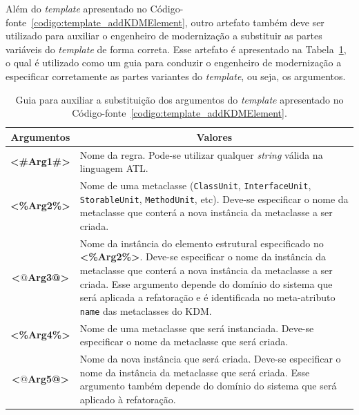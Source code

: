 Além do \textit{template} apresentado no Código-fonte~\ref{codigo:template_addKDMElement}, outro artefato também deve ser utilizado para auxiliar o engenheiro de modernização a substituir as partes variáveis do \textit{template} de forma correta. Esse artefato é apresentado na Tabela~\ref{tab:guia_template_operacao_add}, o qual é utilizado como um guia para conduzir o engenheiro de modernização a especificar corretamente as partes variantes do \textit{template}, ou seja, os argumentos.

\begin{table}[h]
\centering
\caption{Guia para auxiliar a substituição dos argumentos do \textit{template} apresentado no Código-fonte~\ref{codigo:template_addKDMElement}.}
\label{tab:guia_template_operacao_add}
\begin{tabular}{ | m{1.7cm} | m{12cm}| } 
\hline
\multicolumn{1}{|c|}{Argumentos}                                         & \multicolumn{1}{c|}{Valores} \\ \hline
\multicolumn{1}{|c|}{\textbf{<\#Arg1\#>}} & Nome da regra. Pode-se utilizar qualquer \textit{string} válida na linguagem ATL. \\  
\hline
\multicolumn{1}{|c|}{\textbf{<\%Arg2\%>}} & Nome de uma metaclasse (\texttt{ClassUnit}, \texttt{InterfaceUnit}, \texttt{StorableUnit}, \texttt{MethodUnit}, etc). Deve-se especificar o nome da metaclasse que conterá a nova instância da metaclasse a ser criada. \\ 
\hline
\multicolumn{1}{|c|}{\textbf{<$@$Arg3@>}} & Nome da instância do elemento estrutural especificado no \textbf{<\%Arg2\%>}. Deve-se especificar o nome da instância da metaclasse que conterá a nova instância da metaclasse a ser criada. Esse argumento depende do domínio do sistema que será aplicada a refatoração e é identificada no meta-atributo \texttt{name} das metaclasses do KDM.  \\ 
\hline
\multicolumn{1}{|c|}{\textbf{<\%Arg4\%>}} & Nome de uma metaclasse que será instanciada. Deve-se especificar o nome da metaclasse que será criada.  \\ 
\hline
\multicolumn{1}{|c|}{\textbf{<$@$Arg5@>}} & Nome da nova instância que será criada. Deve-se especificar o nome da instância da metaclasse que será criada. Esse argumento também depende do domínio do sistema que será aplicado à refatoração.  \\ 
\hline
\end{tabular}
\end{table}

